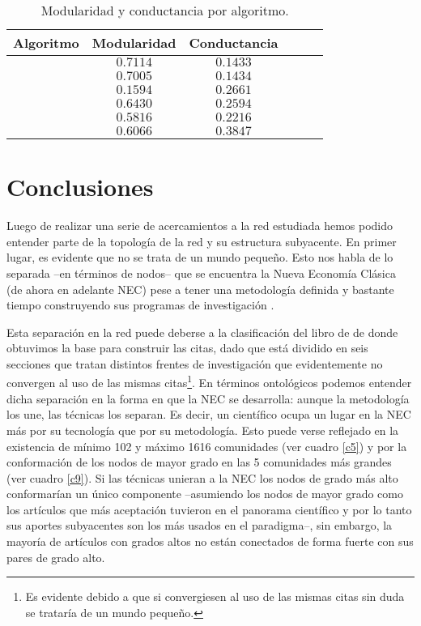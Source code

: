 \documentclass[12pt,letter]{article}
\begin{document}
\vspace{0.5cm}
\begin{table}[h!]
\centering
\begin{tabular}{cccccc}
\textbf{Algoritmo} & \textbf{Modularidad}  & \textbf{Conductancia} \\ \hline 
   \cite{Blondel} & $0.7114$  & $0.1433$\\
   \cite{Clauset} &  $0.7005$ & $0.1434$\\
   \cite{Girvan1, Girvan2}  & $0.1594$ & $0.2661$\\
    \cite{Pons}  & $0.6430$  & $0.2594$ \\
    \cite{Raghavan}  & $0.5816$  & $0.2216$\\
    \cite{Rosvall1} & $0.6066$ & $0.3847$\\ \hline
\end{tabular}
\caption{\small{Modularidad y conductancia por algoritmo}.}
\label{c6}
\end{table}


\section{Conclusiones}
Luego de realizar una serie de acercamientos a la red estudiada hemos podido entender parte de la topología de la red y su estructura subyacente. En primer lugar, es evidente que no se trata de un mundo pequeño. Esto nos habla de lo separada --en términos de nodos-- que se encuentra la Nueva Economía Clásica (de ahora en adelante NEC) pese a tener una metodología definida y bastante tiempo construyendo sus programas de investigación \citep{Salazar1}. 

\vspace{0.5cm}
Esta separación en la red puede deberse a la clasificación del libro de \cite{Lucas2} de donde obtuvimos la base para construir las citas, dado que está dividido en seis secciones que tratan distintos frentes de investigación que evidentemente no convergen al uso de las mismas citas\footnote{Es evidente debido a que si convergiesen al uso de las mismas citas sin duda se trataría de un mundo pequeño.}. En términos ontológicos podemos entender dicha separación en la forma en que la NEC se desarrolla: aunque la metodología los une, las técnicas los separan. Es decir, un científico ocupa un lugar en la NEC más por su tecnología que por su metodología. Esto puede verse reflejado en la existencia de mínimo 102 y máximo 1616 comunidades (ver cuadro \ref{c5}) y por la conformación de los nodos de mayor grado en las 5 comunidades más grandes (ver cuadro \ref{c9}). Si las técnicas unieran a la NEC los nodos de grado más alto conformarían un único componente --asumiendo los nodos de mayor grado como los artículos que más aceptación tuvieron en el panorama científico y por lo tanto sus aportes subyacentes son los más usados en el paradigma--, sin embargo, la mayoría de artículos con grados altos no están conectados de forma fuerte con sus pares de grado alto.
\end{document}
